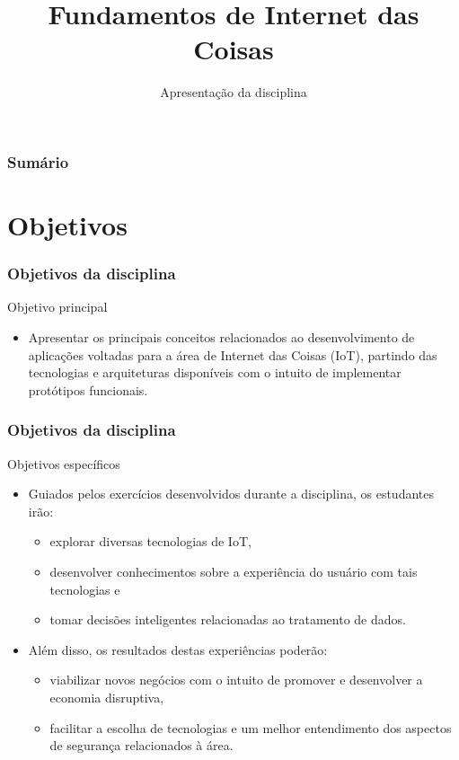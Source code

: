 \documentclass{beamer}
\title{Fundamentos de Internet das Coisas}
\subtitle{Apresentação da disciplina}
\begin{document}
\frame{\titlepage}

\begin{frame}
\frametitle{Sumário}
\tableofcontents
\end{frame}

\section{Objetivos}

\begin{frame}
\frametitle{Objetivos da disciplina}
Objetivo principal
\begin{itemize}
	\item Apresentar os principais conceitos relacionados ao desenvolvimento de aplicações voltadas para a área de Internet das Coisas (IoT), partindo das tecnologias e arquiteturas disponíveis com o intuito de implementar protótipos funcionais.
\end{itemize}
\end{frame}

\begin{frame}
\frametitle{Objetivos da disciplina}
Objetivos específicos
\begin{itemize}
	\item Guiados pelos exercícios desenvolvidos durante a disciplina, os estudantes irão:
	\begin{itemize}
		\item explorar diversas tecnologias de IoT, 
		\item desenvolver conhecimentos sobre a experiência do usuário com tais tecnologias e 
		\item tomar decisões inteligentes relacionadas ao tratamento de dados. 
	\end{itemize} 
	
	\item Além disso, os resultados destas experiências poderão:
	\begin{itemize}
		\item viabilizar novos negócios com o intuito de promover e desenvolver a economia disruptiva, 
		\item facilitar a escolha de tecnologias e um melhor entendimento dos aspectos de segurança relacionados à área.
	\end{itemize}
\end{itemize}
\end{frame}
\end{document}
